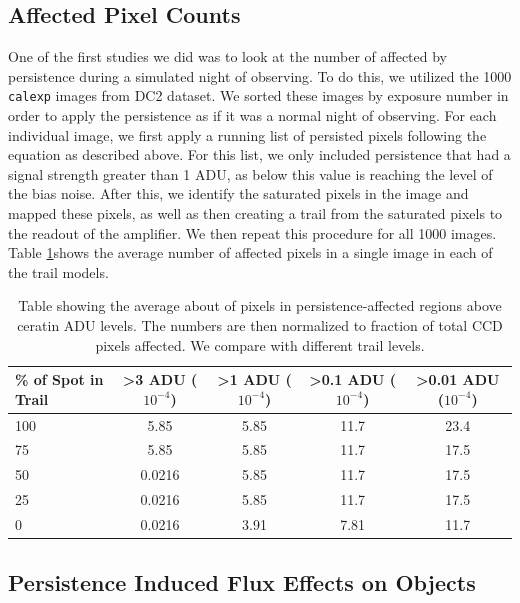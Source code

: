 \documentclass[DM,authoryear,toc]{lsstdoc}
\begin{document}
\subsection{Affected Pixel Counts}

One of the first studies we did was to look at the number of affected by persistence during a simulated night of observing.
To do this, we utilized the 1000 \texttt{calexp} images from DC2 dataset. 
We sorted these images by exposure number in order to apply the persistence as if it was a normal night of observing.
For each individual image, we first apply a running list of persisted pixels following the equation as described above.
For this list, we only included persistence that had a signal strength greater than 1 ADU, as below this value is reaching the level of the bias noise.
After this, we identify the saturated pixels in the image and mapped these pixels, as well as then creating a trail from the saturated pixels to the readout of the amplifier.
We then repeat this procedure for all 1000 images.
Table \ref{tab:persis_affected}shows the average number of affected pixels in a single image in each of the trail models.

\begin{table}[h!]
\centering
\begin{tabular}{|lcccc|}
\hline
\% of Spot in Trail & >3 ADU ($10^{-4}$) & >1 ADU ($10^{-4}$) & >0.1 ADU ($10^{-4}$) & >0.01 ADU ($10^{-4}$) \\
\hline
100 & 5.85 & 5.85 & 11.7 & 23.4 \\
75 & 5.85 & 5.85 & 11.7 & 17.5 \\
50 & 0.0216 & 5.85 & 11.7 & 17.5 \\
25 & 0.0216 & 5.85 & 11.7 & 17.5 \\
0 & 0.0216 & 3.91 & 7.81 & 11.7 \\
\hline
\end{tabular}\label{tab:persis_affected}
\caption{Table showing the average about of pixels in persistence-affected regions above ceratin ADU levels. 
The numbers are then normalized to fraction of total CCD pixels affected.
We compare with different trail levels.
}  
\end{table}



\subsection{Persistence Induced Flux Effects on Objects}
\end{document}
